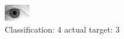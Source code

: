 \begin{figure}[h!]
\begin{center}
\includegraphics[width=0.60\columnwidth]{figures/ID2133_class_4_target_3.png}
\end{center}
\caption{ Classification: 4 actual target: 3}
\label{fig:ID2133_class_4_target_3}
\end{figure}
